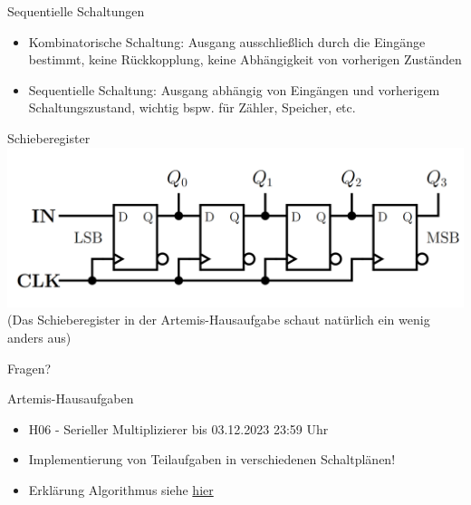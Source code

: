 \documentclass[
  german,            %
  aspectratio=169,    %
]{tumbeamer}
\begin{document}
\begin{frame}[c]{Sequentielle Schaltungen}{}
  \begin{itemize}
    \item Kombinatorische Schaltung: Ausgang ausschließlich durch die Eingänge bestimmt, keine Rückkopplung, keine Abhängigkeit von vorherigen Zuständen
    \item Sequentielle Schaltung: Ausgang abhängig von Eingängen und vorherigem Schaltungszustand, wichtig bspw. für Zähler, Speicher, etc.
  \end{itemize}
\end{frame}

\begin{frame}[c]{Schieberegister}{}
  \centering
  \includegraphics[width=\textwidth]{w06_shift_reg.png}
  \tiny (Das Schieberegister in der Artemis-Hausaufgabe schaut natürlich ein wenig anders aus)
\end{frame}


\begin{frame}[c]{}{}
  \begin{center}
    \LARGE Fragen?
  \end{center}
\end{frame}

\begin{frame}[c, fragile]{Artemis-Hausaufgaben}{}
  \begin{itemize}
    \item H06 - Serieller Multiplizierer bis 03.12.2023 23:59 Uhr
    \item Implementierung von Teilaufgaben in verschiedenen Schaltplänen!
    \item Erklärung Algorithmus siehe \href{https://zulip.in.tum.de/#narrow/stream/1834-ERA---.C3.9Cbungsblatt-06/topic/Vorgehen.20Multiplikation/near/1326249}{hier}
  \end{itemize}
\end{frame}
\end{document}
